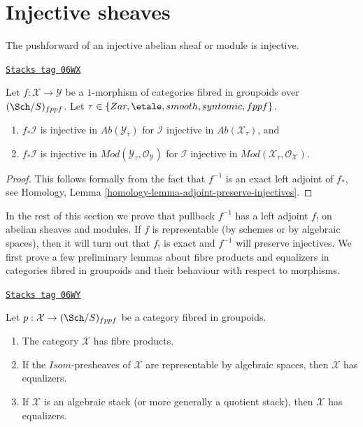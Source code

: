 \section{Injective sheaves}
\label{stacks-sheaves-section-lower-shriek}
The pushforward of an injective abelian sheaf or module is injective.

\begin{lemma}
\label{stacks-sheaves-lemma-pushforward-injective}
\href{https://stacks.math.columbia.edu/tag/06WX}{\texttt{Stacks tag 06WX}}

Let $f : \mathcal{X} \to \mathcal{Y}$ be a $1$-morphism of categories
fibred in groupoids over $(\Sch/S)_{fppf}$. Let
$\tau \in \{Zar, \etale, smooth, syntomic, fppf\}$.
\begin{enumerate}
\item $f_*\mathcal{I}$ is injective in $\textit{Ab}(\mathcal{Y}_\tau)$
for $\mathcal{I}$ injective in $\textit{Ab}(\mathcal{X}_\tau)$, and
\item $f_*\mathcal{I}$ is injective in
$\textit{Mod}(\mathcal{Y}_\tau, \mathcal{O}_\mathcal{Y})$
for $\mathcal{I}$ injective in
$\textit{Mod}(\mathcal{X}_\tau, \mathcal{O}_\mathcal{X})$.
\end{enumerate}
\end{lemma}

\begin{proof}
This follows formally from the fact that $f^{-1}$ is an exact
left adjoint of $f_*$, see
Homology, Lemma \ref{homology-lemma-adjoint-preserve-injectives}.
\end{proof}

In the rest of this section we prove that pullback $f^{-1}$ has a left
adjoint $f_!$ on abelian sheaves and modules. If $f$ is representable (by
schemes or by algebraic spaces), then it will turn out that $f_!$ is exact
and $f^{-1}$ will preserve injectives. We first prove a few
preliminary lemmas about fibre products and equalizers in categories
fibred in groupoids and their behaviour with respect to morphisms.

\begin{lemma}
\label{stacks-sheaves-lemma-fibre-products}
\href{https://stacks.math.columbia.edu/tag/06WY}{\texttt{Stacks tag 06WY}}

Let $p : \mathcal{X} \to (\Sch/S)_{fppf}$
be a category fibred in groupoids.
\begin{enumerate}
\item The category $\mathcal{X}$ has fibre products.
\item If the $\mathit{Isom}$-presheaves of $\mathcal{X}$
are representable by algebraic spaces, then $\mathcal{X}$ has equalizers.
\item If $\mathcal{X}$ is an algebraic stack (or more generally
a quotient stack), then $\mathcal{X}$ has equalizers.
\end{enumerate}
\end{lemma}

